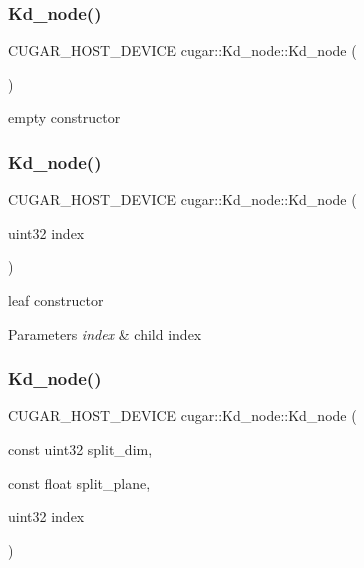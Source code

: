 \subsubsection{\texorpdfstring{Kd\+\_\+node()}{Kd\_node()}\hspace{0.1cm}{\footnotesize\ttfamily [1/4]}}
{\footnotesize\ttfamily C\+U\+G\+A\+R\+\_\+\+H\+O\+S\+T\+\_\+\+D\+E\+V\+I\+CE cugar\+::\+Kd\+\_\+node\+::\+Kd\+\_\+node (\begin{DoxyParamCaption}{ }\end{DoxyParamCaption})\hspace{0.3cm}{\ttfamily [inline]}}

empty constructor \mbox{\label{structcugar_1_1_kd__node_a20157f7254272d30fa6e0d47f1ba51f4}} 
\subsubsection{\texorpdfstring{Kd\+\_\+node()}{Kd\_node()}\hspace{0.1cm}{\footnotesize\ttfamily [2/4]}}
{\footnotesize\ttfamily C\+U\+G\+A\+R\+\_\+\+H\+O\+S\+T\+\_\+\+D\+E\+V\+I\+CE cugar\+::\+Kd\+\_\+node\+::\+Kd\+\_\+node (\begin{DoxyParamCaption}\item[{uint32}]{index }\end{DoxyParamCaption})\hspace{0.3cm}{\ttfamily [inline]}}

leaf constructor


\begin{DoxyParams}{Parameters}
{\em index} & child index \\
\hline
\end{DoxyParams}
\mbox{\label{structcugar_1_1_kd__node_a6c9d0ecf8847c23d991546a50e15892f}} 
\subsubsection{\texorpdfstring{Kd\+\_\+node()}{Kd\_node()}\hspace{0.1cm}{\footnotesize\ttfamily [3/4]}}
{\footnotesize\ttfamily C\+U\+G\+A\+R\+\_\+\+H\+O\+S\+T\+\_\+\+D\+E\+V\+I\+CE cugar\+::\+Kd\+\_\+node\+::\+Kd\+\_\+node (\begin{DoxyParamCaption}\item[{const uint32}]{split\+\_\+dim,  }\item[{const float}]{split\+\_\+plane,  }\item[{uint32}]{index }\end{DoxyParamCaption})\hspace{0.3cm}{\ttfamily [inline]}}

